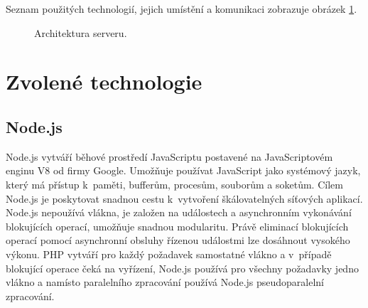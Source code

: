 Seznam použitých technologií, jejich umístění a komunikaci zobrazuje obrázek \ref{img:server-architektura}.
\begin{figure}[h]
	\centering
	\caption{Architektura serveru.}\label{img:server-architektura}
\end{figure}

\section{Zvolené technologie}
\subsection{Node.js}
Node.js vytváří běhové prostředí JavaScriptu postavené na JavaScriptovém enginu V8 od firmy Google. Umožňuje používat JavaScript jako systémový jazyk, který má přístup k~paměti, bufferům, procesům, souborům a soketům. Cílem Node.js je poskytovat snadnou cestu k~vytvoření škálovatelných síťových aplikací. Node.js nepoužívá vlákna, je založen na událostech a asynchronním vykonávání blokujících operací, umožňuje snadnou modularitu. Právě eliminací blokujících operací pomocí asynchronní obsluhy řízenou událostmi lze dosáhnout vysokého výkonu. PHP vytváří pro každý požadavek samostatné vlákno a v~případě blokující operace čeká na vyřízení, Node.js používá pro všechny požadavky jedno vlákno a namísto paralelního zpracování používá Node.js pseudoparalelní zpracování.

